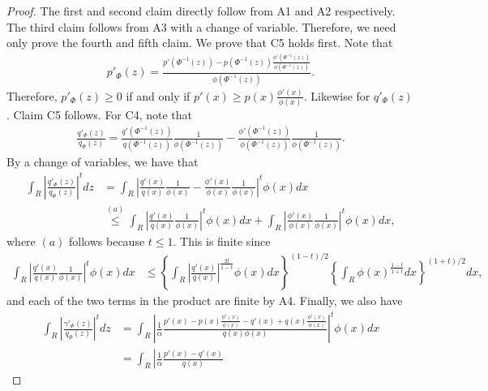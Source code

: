 \documentclass{article}
\begin{document}
\begin{proof}

The first and second claim directly follow from A1 and A2 respectively. The third claim follows from A3 with a change of variable. Therefore, we need only prove the fourth and fifth claim. We prove that C5 holds first. Note that 
\begin{align*}
p'_\Phi(z) = \frac{ p'(\Phi^{-1}(z))  - 
                     p(\Phi^{-1}(z)) \frac{\phi'(\Phi^{-1}(z))}{\phi(\Phi^{-1}(z))} }
           { \phi(\Phi^{-1}(z))}.
\end{align*}
Therefore, $p'_\Phi(z) \geq 0$ if and only if $p'(x) \geq p(x) \frac{\phi'(x)}{\phi(x)}$. Likewise for $q'_\Phi(z)$. Claim C5 follows. For C4, note that 
\begin{align*}
\frac{q'_\Phi(z)}{q_\Phi(z)} = \frac{ q'(\Phi^{-1}(z)) }{q(\Phi^{-1}(z))} \frac{1}{ \phi(\Phi^{-1}(z))} - 
                     \frac{ \phi'(\Phi^{-1}(z)) }{\phi(\Phi^{-1}(z))} \frac{1}{ \phi(\Phi^{-1}(z))}.
\end{align*}
By a change of variables, we have that
\begin{align*}
\int_R \left| \frac{q'_\Phi(z)}{q_\Phi(z)} \right|^t dz 
          &= \int_R \left| \frac{ q'(x) }{q(x)} \frac{1}{ \phi(x)} - 
                     \frac{ \phi'(x) }{\phi(x)} \frac{1}{ \phi(x)} \right|^t \phi(x) dx \\
   &\stackrel{(a)}\leq  \int_R \left| \frac{ q'(x) }{q(x)} \frac{1}{ \phi(x)} \right|^t \phi(x) dx + 
         \int_R  \left| \frac{ \phi'(x) }{\phi(x)} \frac{1}{ \phi(x)} \right|^t \phi(x) dx, 
\end{align*}
where $(a)$ follows because $t \leq 1$. This is finite since 
\begin{align*}
 \int_R \left| \frac{ q'(x) }{q(x)} \frac{1}{ \phi(x)} \right|^t \phi(x) dx &\leq 
       \left\{ \int_R \left| \frac{ q'(x) }{q(x)} \right|^{\frac{2t}{1-t}} \phi(x) dx \right \}^{(1-t)/2}
       \left\{ \int_R \phi(x)^{\frac{1-t}{1+t}} dx \right\}^{(1+t)/2} dx,
\end{align*}
and each of the two terms in the product are finite by A4. Finally, we also have
\begin{align*}
 \int_R \left| \frac{\gamma'_\Phi(z)}{q_\Phi(z)} \right|^t dz &= 
    \int_R \left| \frac{1}{\alpha} \frac{p'(x) - p(x) \frac{\phi'(x)}{\phi(x)} - q'(x) + q(x) \frac{\phi'(x)}{\phi(x)} }
                                       {q(x) \phi(x) } \right|^t \phi(x) dx \\
  &= \int_R \left| \frac{1}{\alpha} \frac{p'(x) - q'(x)}{q(x)} 

\end{align*}
\end{proof}
\end{document}
